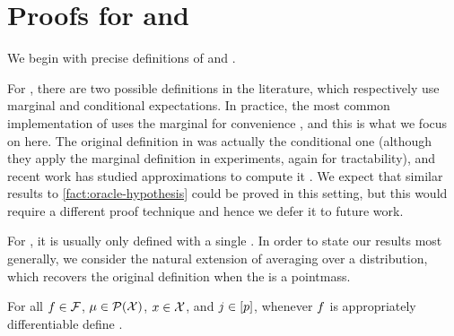 %

\section{Proofs for \completeNames{} and \additiveNames{}}\label{sec:complete-additive-proofs}

%
We begin with precise definitions of \shap{} and \intgrad{}.

For \shap{}, there are two possible definitions in the literature, which respectively use marginal and conditional expectations.
In practice, the most common implementation of \shap{} uses the marginal  for convenience \citep{kumar20shapley}, and this is what we focus on here. The original definition in \citet{lundberg17shapley} was actually the conditional one (although they apply the marginal definition in experiments, again for tractability), and recent work has studied approximations to compute it \citep{aas21shapley}.
We expect that similar results to \cref{fact:oracle-hypothesis} could be proved in this setting, but this would require a different proof technique and hence we defer it to future work.


\begin{definition}[\shap{} \citep{lundberg17shapley}]\label{def:genshap}
Let
\*[
    \shapwt(i)
    = \frac{i!(\covdim-i-1)!}{\covdim!}.
\]
For all $\model\in\modelspace$, $\covdist\in\probspace(\covspace)$, $\covval\in\covspace$, and $j\in[\covdim]$, define
\*[
    \shapdef(\model,\covdist,\covval)\feat{j}
    =  \EE_{\covobs\sim\covdist} \Bigg[\sum_{\featuresub \subseteq [\covdim]}
    \shapwt(\abs{\featuresub})
    \Big(
    \model(\covval\feat{\featuresub\cup\{j\}},\covobs\feat{\comp{\featuresub}\setminus\{j\}})
    -
    \model(\covval\feat{\featuresub},\covobs\feat{\comp{\featuresub}})
    \Big)\Bigg].
\]
\end{definition}

For \intgrad{}, it is usually only defined with a single \basename{} \obsname{}. In order to state our results most generally, we consider the natural extension of averaging over a \basename{} distribution, which recovers the original definition when the \basename{} is a pointmass.

\begin{definition}\label{def:intgrad}
For all $\model\in\modelspace$, $\covdist\in\probspace(\covspace)$, $\covval\in\covspace$, and $j\in[\covdim]$, whenever $f$ is appropriately differentiable define
\*[
    \intgraddef(\model,\covdist,\covval)\feat{j}
    =
    \EE_{\covobs\sim\covdist}\Bigg[(\covval\feat{j} - \covobs\feat{j}) \int_0^1 \grad\feat{j}\model(\covobs + \alpha(\covval-\covobs)) \, \dee \alpha \Bigg].
\]
\end{definition}

